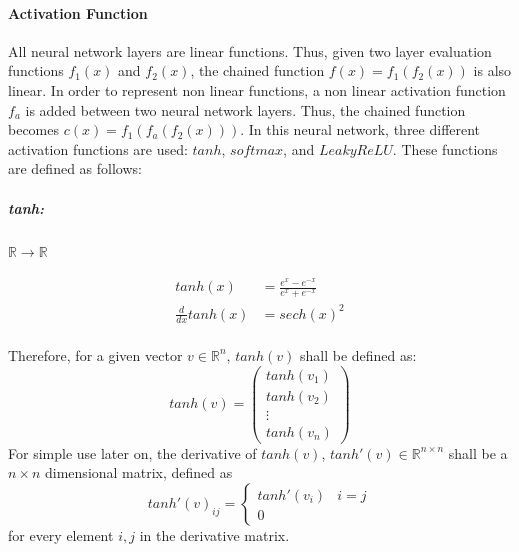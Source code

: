 \documentclass[12pt]{article}
\begin{document}
\paragraph{Activation Function}
All neural network layers are linear functions. Thus, given two layer evaluation functions \(f_1(x)\) and \(f_2(x)\), the chained function \(f(x) = f_1(f_2(x))\) is also linear.
In order to represent non linear functions, a non linear activation function \(f_a\) is added between two neural network layers. Thus, the chained function becomes \(c(x) = f_1(f_a(f_2(x)))\). In this neural network, three different activation functions are used: \(tanh\), \(softmax\), and \(LeakyReLU\). 
\newpage\noindent These functions are defined as follows:
\subparagraph*{tanh:}\(\mathbb{R}\to \mathbb{R}\)

\begin{center}

\end{center}

\begin{align} \label{eq:NN:tanh}
tanh(x) &= \frac{e^x-e^{-x}}{e^x+e^{-x}}\\
\label{eq:NN:tanh_derivative}
\frac{d}{dx}tanh(x) &= sech(x)^2
\end{align}\\
Therefore, for a given vector \(v \in \mathbb R^n\), \(tanh(v)\) shall be defined as:
\begin{equation}\label{eq:vecTanh}
tanh(v) = \left(
\begin{matrix}
tanh(v_1)\\
tanh(v_2)\\
\vdots\\
tanh(v_n)
\end{matrix}
\right)
\end{equation}
For simple use later on, the derivative of \(tanh(v)\), \(tanh'(v) \in \mathbb R^{n \times n}\) shall be a \(n \times n\) dimensional matrix, defined as
\begin{equation}
tanh'(v)_{ij} = \left\{\begin{matrix}
tanh'(v_{i}) & i = j \\
0
\end{matrix}\right.
\end{equation}
for every element \(i,j\) in the derivative matrix.
\end{document}
